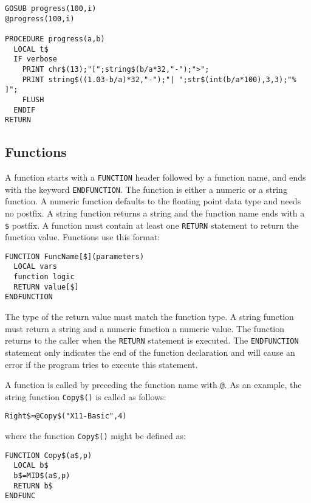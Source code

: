 \begin{mdframed}[hidealllines=true,backgroundcolor=blue!20]
\begin{verbatim}
GOSUB progress(100,i)
@progress(100,i)

PROCEDURE progress(a,b)
  LOCAL t$
  IF verbose
    PRINT chr$(13);"[";string$(b/a*32,"-");">";
    PRINT string$((1.03-b/a)*32,"-");"| ";str$(int(b/a*100),3,3);"% ]";
    FLUSH
  ENDIF
RETURN
\end{verbatim}
\end{mdframed}


\subsection{Functions}

A function starts with a \verb|FUNCTION| header followed by a function name,
and ends with the keyword \verb|ENDFUNCTION|. The function is either a numeric
or a string function. A numeric function defaults to the floating point data
type and needs no postfix. A string function returns a string and the function
name ends with a \verb|$| postfix. A function must contain at least one
\verb|RETURN| statement to return the function value. Functions use this
format:

\begin{verbatim}
FUNCTION FuncName[$](parameters)
  LOCAL vars
  function logic
  RETURN value[$]
ENDFUNCTION
\end{verbatim}

The type of the return value must match the function type. A string function
must return a string and a numeric function a numeric value. 
The function returns to the
caller when the \verb|RETURN| statement is executed. The \verb|ENDFUNCTION|
statement only indicates the end of the function declaration and will cause an
error if the program tries to execute this statement.

A function is called by preceding the function name with \verb|@|. As an
example, the string function \verb|Copy$()| is called as follows:

\begin{mdframed}[hidealllines=true,backgroundcolor=blue!20]
\begin{verbatim}
Right$=@Copy$("X11-Basic",4)
\end{verbatim}
\end{mdframed}
where the function \verb|Copy$()| might be defined as:
\begin{mdframed}[hidealllines=true,backgroundcolor=blue!20]
\begin{verbatim}
FUNCTION Copy$(a$,p)
  LOCAL b$
  b$=MID$(a$,p)
  RETURN b$
ENDFUNC
\end{verbatim}
\end{mdframed}

